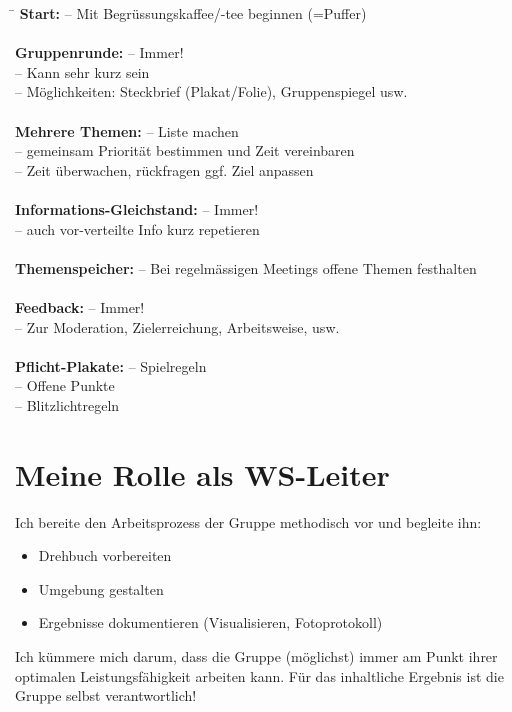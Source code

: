 \begin{tabbing}
	\hspace{6cm}\=\kill
	\textbf{Start:} \> -- Mit Begrüssungskaffee/-tee beginnen (=Puffer) \\ \\
	\textbf{Gruppenrunde:} \> -- Immer! \\
						   \> -- Kann sehr kurz sein \\
						   \> -- Möglichkeiten: Steckbrief (Plakat/Folie), Gruppenspiegel usw. \\ \\
	\textbf{Mehrere Themen:} \> -- Liste machen \\ 
							\> -- gemeinsam Priorität bestimmen und Zeit vereinbaren \\
							\> -- Zeit überwachen, rückfragen ggf. Ziel anpassen \\ \\
	\textbf{Informations-Gleichstand:} \> -- Immer! \\ 
									   \> -- auch vor-verteilte Info kurz repetieren \\ \\
	\textbf{Themenspeicher:} \> -- Bei regelmässigen Meetings offene Themen festhalten \\ \\
	\textbf{Feedback:} \> -- Immer! \\
					   \> -- Zur Moderation, Zielerreichung, Arbeitsweise, usw. \\ \\
	\textbf{Pflicht-Plakate:} \> -- Spielregeln \\
							  \> -- Offene Punkte \\
							  \> -- Blitzlichtregeln
\end{tabbing}

\section{Meine Rolle als WS-Leiter}

Ich bereite den Arbeitsprozess der Gruppe methodisch vor und begleite ihn:
\begin{itemize}
	\item Drehbuch vorbereiten
	\item Umgebung gestalten
	\item Ergebnisse dokumentieren (Visualisieren, Fotoprotokoll)
\end{itemize}
Ich kümmere mich darum, dass die Gruppe (möglichst) immer am Punkt ihrer optimalen Leistungsfähigkeit arbeiten kann. Für das inhaltliche Ergebnis ist die Gruppe selbst verantwortlich!

